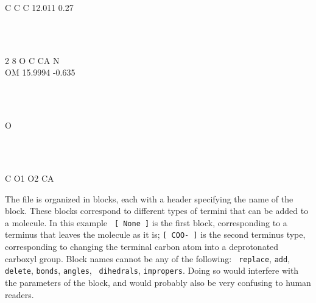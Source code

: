 \begin{tt}
[ None ]\\
\end{tt}\\
\begin{tt}
[ COO- ]\\
\end{tt}\\
\begin{tt}
[ replace ]\\
C       C       C       12.011  0.27\\
\end{tt}\\
\begin{tt}
[ add ]\\
2       8       O       C       CA      N\\
        OM      15.9994 -0.635\\
\end{tt}\\
\begin{tt}
[ delete ]\\
O\\
\end{tt}\\
\begin{tt}
[ impropers ]\\
C       O1      O2      CA\\
\end{tt}

The file is organized in blocks, each with a header specifying the
name of the block. These blocks correspond to different types of
termini that can be added to a molecule. In this example {\tt
[~None~]} is the first block, corresponding to a terminus that leaves
the molecule as it is; {\tt [~COO-~]} is the second terminus type,
corresponding to changing the terminal carbon atom into a deprotonated
carboxyl group. Block names cannot be any of the following: {\tt
replace}, {\tt add}, {\tt delete}, {\tt bonds}, {\tt angles}, {\tt
dihedrals}, {\tt impropers}.  Doing so would interfere with the parameters
of the block, and would probably also be very confusing to human
readers.

